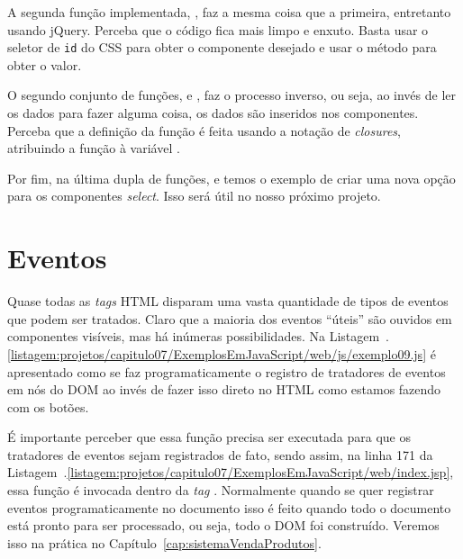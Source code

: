 A segunda função implementada, , faz a mesma coisa que a primeira, entretanto usando jQuery. Perceba que o código fica mais limpo e enxuto. Basta usar o seletor de \texttt{id} do CSS para obter o componente desejado e usar o método  para obter o valor.

O segundo conjunto de funções,  e \newline%
, faz o processo inverso, ou seja, ao invés de ler os dados para fazer alguma coisa, os dados são inseridos nos componentes. Perceba que a definição da função  é feita usando a notação de \textit{closures}, atribuindo a função à variável .

Por fim, na última dupla de funções,  e \newline%
 temos o exemplo de criar uma nova opção para os componentes \textit{select}. Isso será útil no nosso próximo projeto.



\section{Eventos}

Quase todas as \textit{tags} HTML disparam uma vasta quantidade de tipos de eventos que podem ser tratados. Claro que a maioria dos eventos ``úteis'' são ouvidos em componentes visíveis, mas há inúmeras possibilidades. Na Listagem~\thechapter.\ref{listagem:projetos/capitulo07/ExemplosEmJavaScript/web/js/exemplo09.js} é apresentado como se faz programaticamente o registro de tratadores de eventos em nós do DOM ao invés de fazer isso direto no HTML como estamos fazendo com os botões.


É importante perceber que essa função precisa ser executada para que os tratadores de eventos sejam registrados de fato, sendo assim, na linha 171 da Listagem~\thechapter.\ref{listagem:projetos/capitulo07/ExemplosEmJavaScript/web/index.jsp}, essa função é invocada dentro da \textit{tag} . Normalmente quando se quer registrar eventos programaticamente no documento isso é feito quando todo o documento está pronto para ser processado, ou seja, todo o DOM foi construído. Veremos isso na prática no Capítulo~\ref{cap:sistemaVendaProdutos}.

